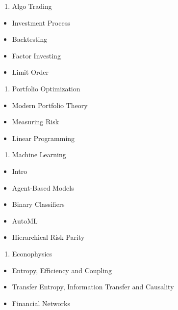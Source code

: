 \documentclass[]{book}
\providecommand{\tightlist}{%
  \setlength{\itemsep}{0pt}\setlength{\parskip}{0pt}}
\theoremstyle{definition}
\theoremstyle{definition}
\theoremstyle{definition}
\theoremstyle{remark}
\begin{document}
\begin{enumerate}
\def\labelenumi{\arabic{enumi}.}
\setcounter{enumi}{1}
\tightlist
\item
  Algo Trading
\end{enumerate}

\begin{itemize}
\tightlist
\item
  Investment Process
\item
  Backtesting
\item
  Factor Investing
\item
  Limit Order
\end{itemize}

\begin{enumerate}
\def\labelenumi{\arabic{enumi}.}
\setcounter{enumi}{2}
\tightlist
\item
  Portfolio Optimization
\end{enumerate}

\begin{itemize}
\tightlist
\item
  Modern Portfolio Theory
\item
  Measuring Risk
\item
  Linear Programming
\end{itemize}

\begin{enumerate}
\def\labelenumi{\arabic{enumi}.}
\setcounter{enumi}{3}
\tightlist
\item
  Machine Learning
\end{enumerate}

\begin{itemize}
\tightlist
\item
  Intro
\item
  Agent-Based Models
\item
  Binary Classifiers
\item
  AutoML
\item
  Hierarchical Risk Parity
\end{itemize}

\begin{enumerate}
\def\labelenumi{\arabic{enumi}.}
\setcounter{enumi}{4}
\tightlist
\item
  Econophysics
\end{enumerate}

\begin{itemize}
\tightlist
\item
  Entropy, Efficiency and Coupling
\item
  Transfer Entropy, Information Transfer and Causality
\item
  Financial Networks
\end{itemize}
\end{document}
